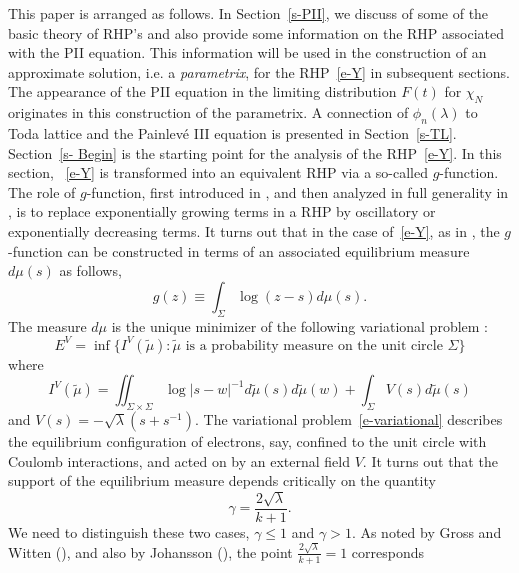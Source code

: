 \documentclass{amsart}
\theoremstyle{definition}
\theoremstyle{remark}
\numberwithin{equation}{section}
\newcommand{\wt}{\widetilde}
\begin{document}
\bigskip
This paper is arranged as follows. 
In Section~\ref{s-PII}, we discuss of some of the basic theory of RHP's 
and also provide some information on the RHP associated with the PII equation.
This information will be used in the construction of an approximate solution,  
i.e. a \emph{parametrix},  
for the RHP~\eqref{e-Y} in  
subsequent sections. The appearance of the 
PII equation in the limiting distribution 
$F(t)$ for $\chi_N$  
originates in this construction of the parametrix.
A connection of $\phi_n(\lambda)$ to Toda lattice and the Painlev\'e III equation 
is presented in Section~\ref{s-TL}.
Section~\ref{s- Begin} is the starting point for the 
analysis of the RHP~\eqref{e-Y}.
In this section, ~\eqref{e-Y} is transformed into an equivalent 
RHP via  
a so-called $g$-function.
The role of $g$-function, first introduced in \cite{DZ}, and then 
analyzed in full generality in \cite{DVZ}, 
is to replace exponentially growing terms in a RHP by oscillatory or 
exponentially decreasing terms.
It turns out that in the case of~\eqref{e-Y}, as in \cite{DKMVZ}, the 
$g$-function can be constructed in terms of an associated equilibrium 
measure $d\mu(s)$ as follows, 
\begin{equation}
   g(z)\equiv\int_{\Sigma} \log(z-s) d\mu(s).
\end{equation}
The measure $d\mu$ is the unique minimizer of the following variational problem : 
\begin{equation}\label{e-variational}
   E^{V}=\inf \{I^{V}(\wt{\mu}) : \text{$\wt{\mu}$ is a probability measure on the 
unit circle $\Sigma$}\}
\end{equation}
where 
\begin{equation}
   I^{V}(\wt{\mu})= \iint_{\Sigma\times\Sigma} \log|s-w|^{-1} 
d\wt{\mu}(s) d\wt{\mu}(w) +\int_{\Sigma} V(s) d\wt{\mu}(s)
\end{equation}
and $V(s)=-\sqrt{\lambda}(s+s^{-1})$. 
The variational problem~\eqref{e-variational} describes the equilibrium configuration 
of electrons, say, confined to the unit circle with Coulomb interactions, 
and acted on by an external field $V$.
It turns out that the support of the equilibrium measure depends  
critically on the quantity 
\begin{equation}
   \gamma=\frac{2\sqrt{\lambda}}{k+1}.
\end{equation}
We need to distinguish these two cases, $\gamma\le 1$ and $\gamma>1$.
As noted by Gross and Witten (\cite{GW}), and also by Johansson 
(\cite{Johan}), the point $\frac{2\sqrt{\lambda}}{k+1}=1$ corresponds 
\end{document}

